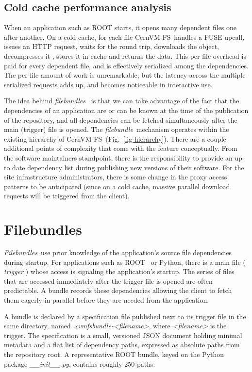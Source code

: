 \documentclass{webofc}
\newcommand{\cvmfs}{CernVM-FS}
\newcommand{\filebundle}{\emph{filebundle}}
\newcommand{\filebundles}{\emph{filebundles}}
\newcommand{\Filebundles}{\emph{Filebundles}}
\begin{document}
\subsection{Cold cache performance analysis}
\label{sec-time}

When an application such as ROOT starts, it opens many dependent files one after
another. On a cold cache, for each file \cvmfs\ handles a FUSE
upcall, issues an HTTP request, waits for the round trip, downloads the
object, decompresses it , stores it in cache and returns the data. 
This per-file overhead is paid for every dependent file, and is
effectively serialized among the dependencies. 
The per-file amount of work is unremarkable, but the latency across the multiple serialized requests adds up, and becomes noticeable in interactive use.

The idea behind \emph{ \filebundles\ } is that we can take advantage of the fact that the dependencies of an application are or can be known at the time of the publication of the repository, and all dependencies can be fetched simultaneously after the main (trigger) file is opened.
The \filebundle\ mechanism operates within the existing hierarchy of \cvmfs\ (Fig.~\ref{fig-hierarchy}).
There are a couple additional points of complexity that come with the feature conceptually.
From the software maintainers standpoint, there is the responsibility to provide an up to date dependency list during publishing new versions of their software.
For the site infrastructure administrators, there is some change in the proxy access patterns to be anticipated (since on a cold cache, massive parallel download requests will be triggered from the client).

\section{Filebundles}
\label{sec-design}

\Filebundles\ use prior knowledge of the application's source file dependencies during startup. For applications
such as ROOT~\cite{ref-root} or Python, there is a main file (\emph{ trigger }) whose access is signaling the application's startup.
The series of files that are accessed immediately after the trigger file is opened are often predictable.
A bundle records these dependencies allowing the client to fetch them eagerly in parallel before they are needed from the application.

A bundle is declared by a specification file published next to its
trigger file in the same directory, named
\emph{.cvmfsbundle-<filename>}, where \emph{<filename>} is the
trigger. The specification is a small, versioned JSON document holding
minimal metadata and a flat list of dependency paths, expressed as
absolute paths from the repository root. A representative ROOT bundle,
keyed on the Python package \emph{\_\_init\_\_.py}, contains roughly
250 paths:
\end{document}
